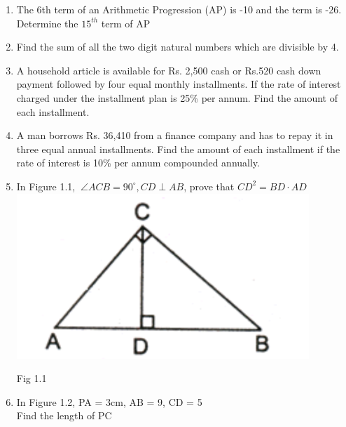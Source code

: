 \documentclass[journal,12pt,twocolumn]{IEEEtran}
\begin{document}
\begin{enumerate}[label=1.\arabic*]
\item The 6th term of an Arithmetic Progression (AP) is -10 and the term is -26. Determine the $15^{th}$ term of AP\\
\item Find the sum of all the two digit natural numbers which are divisible by 4.\\
\item A household article is available for Rs. 2,500 cash or Rs.520 cash down payment followed by four equal monthly installments.
If the rate of interest charged under the installment plan is 25\% per annum. Find the amount of each installment.\\
\item A man borrows Rs. 36,410 from a finance company and has to repay it in three equal annual installments. Find the amount of each
installment if the rate of interest is 10\% per annum compounded annually.\\
\item In Figure 1.1, \(  \ \angle{ACB} = 90^\circ , CD \perp AB \), prove that \(CD^2 = BD \cdot AD\)\\
\includegraphics[scale = 0.75]{fig 1.1}\\
\begin{flushright}
Fig 1.1\\
\end{flushright}
\vspace{2mm}
\item In Figure 1.2, PA = 3cm, AB = 9, CD = 5\\
Find the length of PC\\

\end{enumerate}
\end{document}
